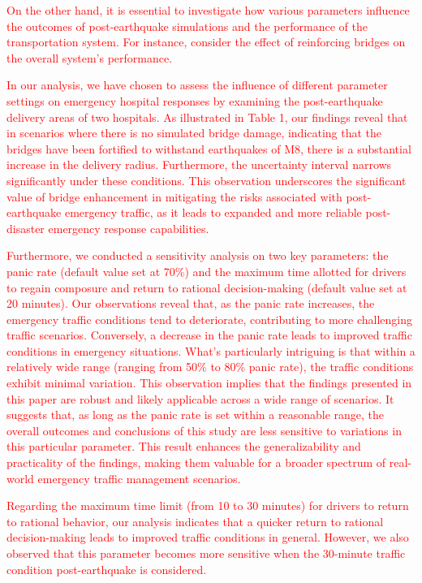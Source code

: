 \documentclass[review,11pt,nonatbib]{elsarticle}
\begin{document}
\textcolor{red}{
On the other hand, it is essential to investigate how various parameters influence the outcomes of post-earthquake simulations and the performance of the transportation system. For instance, consider the effect of reinforcing bridges on the overall system's performance.}

\textcolor{red}{In our analysis, we have chosen to assess the influence of different parameter settings on emergency hospital responses by examining the post-earthquake delivery areas of two hospitals. As illustrated in Table 1, our findings reveal that in scenarios where there is no simulated bridge damage, indicating that the bridges have been fortified to withstand earthquakes of M8, there is a substantial increase in the delivery radius. Furthermore, the uncertainty interval narrows significantly under these conditions. This observation underscores the significant value of bridge enhancement in mitigating the risks associated with post-earthquake emergency traffic, as it leads to expanded and more reliable post-disaster emergency response capabilities.}

\textcolor{red}{Furthermore, we conducted a sensitivity analysis on two key parameters: the panic rate (default value set at 70\%) and the maximum time allotted for drivers to regain composure and return to rational decision-making (default value set at 20 minutes).} \textcolor{red}{Our observations reveal that,  as the panic rate increases, the emergency traffic conditions tend to deteriorate, contributing to more challenging traffic scenarios. Conversely, a decrease in the panic rate leads to improved traffic conditions in emergency situations. What's particularly intriguing is that within a relatively wide range (ranging from 50\% to 80\% panic rate), the traffic conditions exhibit minimal variation. This observation implies that the findings presented in this paper are robust and likely applicable across a wide range of scenarios. It suggests that, as long as the panic rate is set within a reasonable range, the overall outcomes and conclusions of this study are less sensitive to variations in this particular parameter. This result enhances the generalizability and practicality of the findings, making them valuable for a broader spectrum of real-world emergency traffic management scenarios.}

\textcolor{red}{Regarding the maximum time limit (from 10 to 30 minutes) for drivers to return to rational behavior, our analysis indicates that a quicker return to rational decision-making leads to improved traffic conditions in general. However, we also observed that this parameter becomes more sensitive when  the 30-minute traffic condition post-earthquake is considered.}
\end{document}
